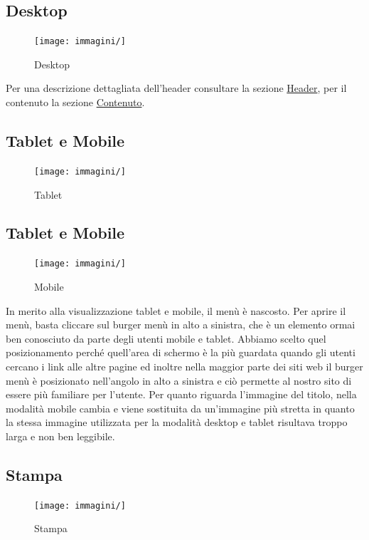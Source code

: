 \documentclass[a4paper]{article}
\begin{document}
	\subsection{Desktop}
	\begin{figure}[H]
		\centering
		\texttt{[image: immagini/]}
		\caption{Desktop}
	\end{figure}

	Per una descrizione dettagliata dell'header consultare la sezione \hyperref[header]{Header}, per il contenuto la sezione \hyperref[contenuto]{Contenuto}.

	\subsection{Tablet e Mobile}
	\begin{figure}[H]
		\centering
		\texttt{[image: immagini/]}
		\caption{Tablet}
	\end{figure}

	\subsection{Tablet e Mobile}
	\begin{figure}[H]
		\centering
		\texttt{[image: immagini/]}
		\caption{Mobile}
	\end{figure}

	In merito alla visualizzazione tablet e mobile, il menù è nascosto. Per aprire il menù, basta cliccare sul burger menù in alto a sinistra, che è un elemento ormai ben conosciuto da parte degli utenti mobile e tablet. Abbiamo scelto quel posizionamento perché quell'area di schermo è la più guardata quando gli utenti cercano i link alle altre pagine ed inoltre nella maggior parte dei siti web il burger menù è posizionato nell'angolo in alto a sinistra e ciò permette al nostro sito di essere più familiare per l'utente. Per quanto riguarda l'immagine del titolo, nella modalità mobile cambia e viene sostituita da un'immagine più stretta in quanto la stessa immagine utilizzata per la modalità desktop e tablet risultava troppo larga e non ben leggibile. 


	\subsection{Stampa}
	\begin{figure}[H]
		\centering
		\texttt{[image: immagini/]}
		\caption{Stampa}
	\end{figure}
\end{document}
